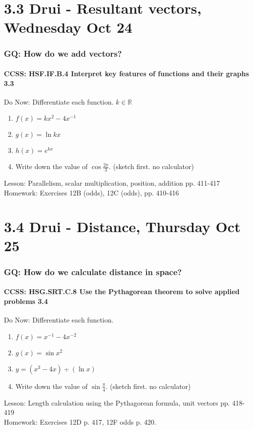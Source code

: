 \documentclass{beamer}
\begin{document}
\section{3.3 Drui - Resultant vectors, Wednesday Oct 24}
  \frame
  {
    \frametitle{GQ: How do we add vectors?}
    \framesubtitle{CCSS: HSF.IF.B.4 Interpret key features of functions and their graphs \qquad \alert{3.3}}

    \begin{block}{Do Now: Differentiate each function. $k \in \mathbb{R}$}
    \begin{enumerate}
        \item $f(x)=k x^2-4x^{-1}$
        \item $g(x)=\ln kx$
        \item $h(x)=e^{kx}$
        \item Write down the value of $\displaystyle \cos \frac{2 \pi}{3}$. (sketch first. no calculator)
    \end{enumerate}
    \end{block}
    Lesson: Parallelism, scalar multiplication, position, addition pp. 411-417\\ \bigskip
    Homework: Exercises 12B (odds), 12C (odds), pp. 410-416
  }

\section{3.4 Drui - Distance, Thursday Oct 25}
  \frame
  {
    \frametitle{GQ: How do we calculate distance in space?}
    \framesubtitle{CCSS: HSG.SRT.C.8 Use the Pythagorean theorem to solve applied problems \qquad \alert{3.4}}

    \begin{block}{Do Now: Differentiate each function.}
    \begin{enumerate}
        \item $f(x)=x^{-1}-4x^{-2}$
        \item $g(x)=\sin x^2$
        \item $y=(x^3-4x) \div (\ln x)$
        \item Write down the value of $\displaystyle \sin \frac{\pi}{4}$. (sketch first. no calculator)
    \end{enumerate}
    \end{block}
    Lesson: Length calculation using the Pythagorean formula, unit vectors pp. 418-419\\ \bigskip
    Homework: Exercises 12D p. 417, 12F odds p. 420.
  }
\end{document}
